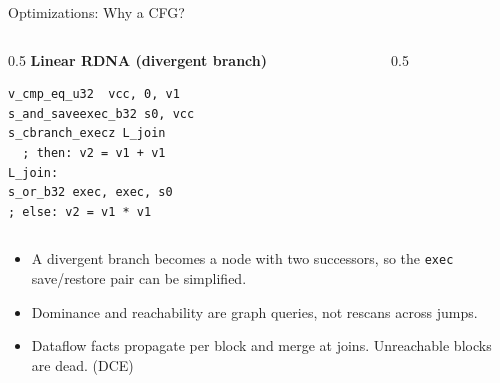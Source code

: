 \documentclass[10pt,aspectratio=169]{beamer}
\begin{document}
    \begin{frame}[fragile]{Optimizations: Why a CFG?}
    \hspace*{1.2cm}\begin{minipage}{\dimexpr\textwidth-1.2cm}
    \begin{columns}[T]
    \begin{column}{0.5\textwidth}
    \textbf{Linear RDNA (divergent branch)}
{\scriptsize\begin{verbatim}
v_cmp_eq_u32  vcc, 0, v1
s_and_saveexec_b32 s0, vcc
s_cbranch_execz L_join
  ; then: v2 = v1 + v1
L_join:
s_or_b32 exec, exec, s0
; else: v2 = v1 * v1
\end{verbatim}}
    \end{column}
    \begin{column}{0.5\textwidth}
    \centering
    \end{column}
    \end{columns}
    \vspace{0.5em}
    {\small\begin{itemize}
        \item A divergent branch becomes a node with two successors, so the
          \texttt{exec} save/restore pair can be simplified.
        \item Dominance and reachability are graph queries, not rescans across jumps.
        \item Dataflow facts propagate per block and merge at joins. Unreachable
          blocks are dead. (DCE)
    \end{itemize}}
    \end{minipage}
    \end{frame}
\end{document}
